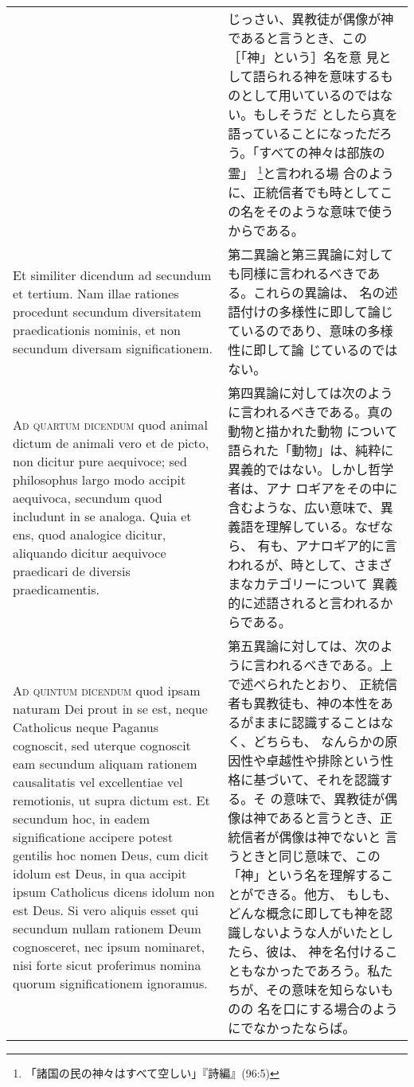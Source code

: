\documentclass[paper=a4paper,fontsize=10pt,jafontsize=9pt,titlepage]{jlreq}
\begin{document}
\begin{longtable}{p{21em}p{21em}}
&

じっさい、異教徒が偶像が神であると言うとき、この［「神」という］名を意
見として語られる神を意味するものとして用いているのではない。もしそうだ
としたら真を語っていることになっただろう。「すべての神々は部族の霊」
\footnote{「諸国の民の神々はすべて空しい」『詩編』(96:5)}と言われる場
合のように、正統信者でも時としてこの名をそのような意味で使うからである。

\\

Et similiter dicendum ad secundum et tertium. Nam illae rationes
procedunt secundum diversitatem praedicationis nominis, et non
secundum diversam significationem.

&

第二異論と第三異論に対しても同様に言われるべきである。これらの異論は、
名の述語付けの多様性に即して論じているのであり、意味の多様性に即して論
じているのではない。

\\

{\scshape Ad quartum dicendum} quod animal dictum de animali vero et
de picto, non dicitur pure aequivoce; sed philosophus largo modo
accipit aequivoca, secundum quod includunt in se analoga. Quia et ens,
quod analogice dicitur, aliquando dicitur aequivoce praedicari de
diversis praedicamentis.

&

第四異論に対しては次のように言われるべきである。真の動物と描かれた動物
について語られた「動物」は、純粋に異義的ではない。しかし哲学者は、アナ
ロギアをその中に含むような、広い意味で、異義語を理解している。なぜなら、
有も、アナロギア的に言われるが、時として、さまざまなカテゴリーについて
異義的に述語されると言われるからである。

\\

{\scshape Ad quintum dicendum} quod ipsam naturam Dei prout in se est,
neque Catholicus neque Paganus cognoscit, sed uterque cognoscit eam
secundum aliquam rationem causalitatis vel excellentiae vel
remotionis, ut supra dictum est. Et secundum hoc, in eadem
significatione accipere potest gentilis hoc nomen Deus, cum dicit
idolum est Deus, in qua accipit ipsum Catholicus dicens idolum non est
Deus. Si vero aliquis esset qui secundum nullam rationem Deum
cognosceret, nec ipsum nominaret, nisi forte sicut proferimus nomina
quorum significationem ignoramus.

&

第五異論に対しては、次のように言われるべきである。上で述べられたとおり、
正統信者も異教徒も、神の本性をあるがままに認識することはなく、どちらも、
なんらかの原因性や卓越性や排除という性格に基づいて、それを認識する。そ
の意味で、異教徒が偶像は神であると言うとき、正統信者が偶像は神でないと
言うときと同じ意味で、この「神」という名を理解することができる。他方、
もしも、どんな概念に即しても神を認識しないような人がいたとしたら、彼は、
神を名付けることもなかったであろう。私たちが、その意味を知らないものの
名を口にする場合のようにでなかったならば。

\end{longtable}
\newpage
{}
\end{document}
